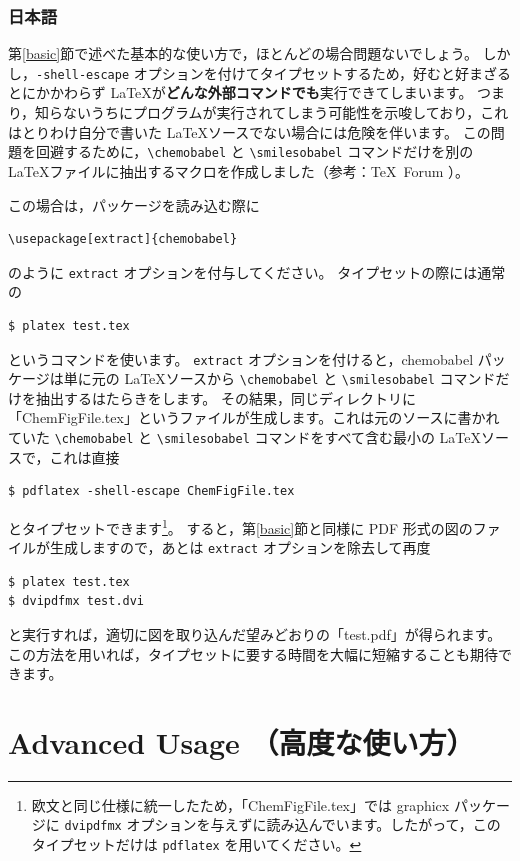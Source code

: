 \documentclass[12pt]{jsarticle}
\begin{document}
\clearpage

\subsubsection{日本語}

第\ref{basic}節で述べた基本的な使い方で，ほとんどの場合問題ないでしょう。
しかし，\verb|-shell-escape| オプションを付けてタイプセットするため，好むと好まざるとにかかわらず \LaTeX が\textbf{どんな外部コマンドでも}実行できてしまいます。
つまり，知らないうちにプログラムが実行されてしまう可能性を示唆しており，これはとりわけ自分で書いた \LaTeX ソースでない場合には危険を伴います。
この問題を回避するために，\verb|\chemobabel| と \verb|\smilesobabel| コマンドだけを別の \LaTeX ファイルに抽出するマクロを作成しました（参考：\TeX\ Forum \cite{OKU}）。

この場合は，パッケージを読み込む際に
\begin{verbatim}
\usepackage[extract]{chemobabel}
\end{verbatim}
のように \verb|extract| オプションを付与してください。
タイプセットの際には通常の
\begin{verbatim}
$ platex test.tex
\end{verbatim}
というコマンドを使います。
\verb|extract| オプションを付けると，\textsf{chemobabel} パッケージは単に元の \LaTeX ソースから \verb|\chemobabel| と \verb|\smilesobabel| コマンドだけを抽出するはたらきをします。
その結果，同じディレクトリに「ChemFigFile.tex」というファイルが生成します。これは元のソースに書かれていた \verb|\chemobabel| と \verb|\smilesobabel| コマンドをすべて含む最小の \LaTeX ソースで，これは直接
\begin{verbatim}
$ pdflatex -shell-escape ChemFigFile.tex
\end{verbatim}
とタイプセットできます\footnote{欧文と同じ仕様に統一したため，「ChemFigFile.tex」では \textsf{graphicx} パッケージに \texttt{dvipdfmx} オプションを与えずに読み込んでいます。したがって，このタイプセットだけは \texttt{pdflatex} を用いてください。}。
すると，第\ref{basic}節と同様に PDF 形式の図のファイルが生成しますので，あとは \verb|extract| オプションを除去して再度
\begin{verbatim}
$ platex test.tex
$ dvipdfmx test.dvi
\end{verbatim}
と実行すれば，適切に図を取り込んだ望みどおりの「test.pdf」が得られます。
この方法を用いれば，タイプセットに要する時間を大幅に短縮することも期待できます。

\clearpage

\section{Advanced Usage （高度な使い方）}
\end{document}
